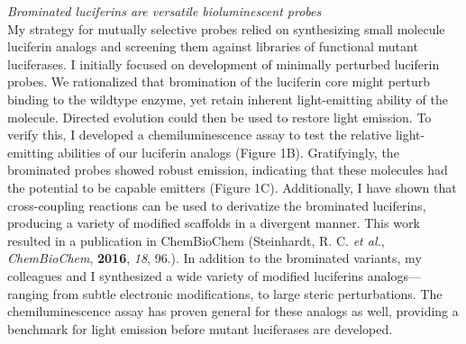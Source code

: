 \documentclass[11pt]{article}
\begin{document}
\textit{Brominated luciferins are versatile bioluminescent probes}\\
My strategy for mutually selective probes relied on synthesizing small molecule luciferin analogs and screening them against libraries of functional mutant luciferases. I initially focused on development of minimally perturbed luciferin probes. We rationalized that bromination of the luciferin core might perturb binding to the wildtype enzyme, yet retain inherent light-emitting ability of the molecule. Directed evolution could then be used to restore light emission. To verify this, I developed a chemiluminescence assay to test the relative light-emitting abilities of our luciferin analogs (Figure 1B). Gratifyingly, the brominated probes showed robust emission, indicating that these molecules had the potential to be capable emitters (Figure 1C). Additionally, I have shown that cross-coupling reactions can be used to derivatize the brominated luciferins, producing a variety of modified scaffolds in a divergent manner. This work resulted in a publication in ChemBioChem (Steinhardt, R. C. \textit{et al.}, \textit{ChemBioChem}, \textbf{2016}, \textit{18}, 96.). In addition to the brominated variants, my colleagues and I synthesized a wide variety of modified luciferins analogs—ranging from subtle electronic modifications, to large steric perturbations. The chemiluminescence assay has proven general for these analogs as well, providing a benchmark for light emission before mutant luciferases are developed.
\end{document}
